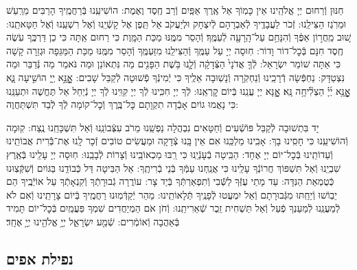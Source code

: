 \documentclass[twoside, openany, parskip=half, 11pt]{book}
\begin{document}
חַנּוּן וְֿרַחוּם יְיָ אֱלֹהֵֽינוּ אֵין כָּמֽוֹךָ אֵל אֶֽרֶךְ אַפַּֽיִם וְֿרַב חֶֽסֶד וֶאֶמֶת: הוֹשִׁיעֵֽנוּ בְּֿרַחֲמֶֽיךָ הָרַבִּים מֵרַֽעַשׁ וּמֵרֹֽגֶז הַצִּילֵֽנוּ: זְֿכֹר לַעֲבָדֶֽיךָ לְֿאַבְרָהָם לְֿיִצְחָק וּלְיַעֲקֹב אַל תֵּֽפֶן אֶל קָשְֿׁיֵֽנוּ וְֿאֶל רִשְׁעֵֽנוּ וְֿאֶל חַטָּאתֵֽנוּ:
שׁ֚וּב מֵֽחֲר֣וֹן אַפֶּ֔ךָ וְֿהִנָּחֵ֥ם עַל־הָֽרָעָ֖ה לְֿעַמֶּֽךָ׃ וְֿהָסֵר מִמֶּֽנּוּ מַכַּת הַמָּֽוֶת כִּי רַחוּם אַֽתָּה כִּי כֵן דַּרְכֶּֽךָ עֹֽשֶׂה חֶֽסֶד חִנָּם בְּֿכׇל־דוֹר וָדוֹר: חֽוּסָה יְיָ עַל עַמֶּֽךָ וְֿהַצִּילֵֽנוּ מִזַּעְמֶּֽךָ וְֿהָסֵר מִמֶּֽנּוּ מַכַּת הַמַּגֵּפָה וּגְזֵרָה קָשָׁה כִּי אַתָּה שׁוֹמֵר יִשְׂרָאֵל:
לְֿךָ֤ אֲדֹנָי֙ הַצְּֿדָקָ֔ה וְֿלָ֛נוּ בֹּ֥שֶׁת הַפָּנִ֖ים מַה נִּתְאוֹנֵן וּמַה נֹּאמַר מַה נְּֿדַבֵּר וּמַה נִּצְטַדָּק: נַחְפְּֿשָׂה דְֿרָכֵֽינוּ וְֿנַחְקֹֽרָה וְֿנָשֽׁוּבָה אֵלֶֽיךָ כִּי יְֿמִינְֿךָ פְֿשׁוּטָה לְֿקַבֵּל שָׁבִים:
אׇׇׇׇׇׇׇׇָֽנָּ֣א יְ֖יָ הוֹשִׁ֣יעָה נָּ֑א אׇׇׇׇׇׇׇׇָֽנָּ֥א יְ֜יָ֗ הַצְלִ֘יחָ֥ה נָּֽא׃ אׇׇׇׇָנָּא יְיָ עֲנֵֽנוּ בְּֿיוֹם קׇרְאֵֽנוּ: לְֿךָ יְיָ חִכִּֽינוּ לְֿךָ יְיָ קִוִּֽינוּ לְֿךָ יְיָ נְֿיַחֵל אַל תֶּחֱשֶׁה וּתְעַנֵּֽנוּ כִּי נָאֲמוּ גוֹיִם אָבְֿדָה תִקְוָתָם כׇּל־בֶּֽרֶךְ וְֿכׇל־קוֹמָה לְֿךָ לְֿבַד תִּשְׁתַּחֲוֶה:

יָד בִּתְשׁוּבָה לְֿקַבֵּל פּוֹשְֿׁעִים וְֿחַטָּאִים נִבְהֲלָה נַפְשֵֽׁנוּ מֵרֹב עִצְּֿבוֹנֵֽנוּ וְֿאַל תִּשְׁכָּחֵֽנוּ נֶֽצַח: קֽוּמָה וְֿהוֹשִׁיעֵֽנוּ כִּי חָסִֽינוּ בָךְ: אָבִֽינוּ מַלְכֵּֽנוּ אִם אֵין בָּֽנוּ צְֿדָקָה וּמַעֲשִׂים טוֹבִים זְֿכָר לָֽנוּ אֶת־בְּֿֿרִית אֲבוֹתֵֽינוּ וְֿעֵדוֹתֵֽינוּ בְּֿכׇל־יוֹם יְיָ אֶחָד: הַבִּֽיטָה בְֿעָנְֿיֵֽנוּ כִּי רַֽבּוּ מַכְאוֹבֵֽינוּ וְֿצָרוֹת לְֿבָבֵֽנוּ: חֽוּסָה יְיָ עָלֵֽינוּ בְּֿאֶֽרֶץ שִׁבְיֵֽנוּ וְֿאַל תִּשְׁפּוֹךְ חֲרוֹנְֿךָ עָלֵֽינוּ כִּי אֲנַֽחְנוּ עַמְּֿךָ בְּֿנֵי בְֿרִיתֶֽךָ: אֵל הַבִּיטָה דַּל כְּֿבוֹדֵֽנוּ בַּגּוֹיִם וְֿשִׁקְּֿצֽוּנוּ כְּֿטֻמְאַת הַנִּדָּה: עַד מָתַי עֻזְּֿךָ לַשְּֿֿׁבִי וְֿתִפְאַרְתְּֿךָ בְּֿיַד צָר: עוֹרֲרָה גְֿבוּרָתְֿךָ וְֿקִנְאָתְֿךָ עַל אוֹיְֿבֶֽיךָ הֵם יֵבֽוֹשׁוּ וְֿיֵחַֽתּוּ מִגְּֿבוּרָתָם וְֿאַל יִמְעֲטוּ לְֿפָנֶֽיךָ תְּֿלָאוֹתֵֽינוּ: מַהֵר יְֿקַדְּֿמֽוּנוּ רַחֲמֶֽיךָ בְּֿיוֹם צָרָתֵֽינוּ וְֿאִם לֹא לְֿמַעֲנֵֽנוּ לְֿמַעַנְךָ פְֿעַל וְֿאַל תַּשְׁחִית זֵֽכֶר שְֿׁאֵרִיתֵֽנוּ: וְֿחֹן אֹם הַמְיַחֲדִים שִׁמְךָ פַּעֲמַֽיִם בְּֿכׇל־יוֹם תָּמִיד בְּֿאַהֲבָה וְֿאוֹמְֿרִים:
שְֿׁמַ֖ע יִשְׂרָאֵ֑ל יְיָ֥ אֱלֹהֵ֖ינוּ יְיָ֥ אֶחָֽד׃

\subsection*{ נפילת אפים }
\end{document}
